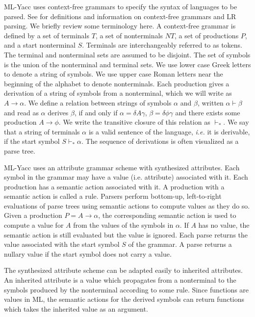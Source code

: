 \documentclass{article}
\begin{document}
ML-Yacc uses context-free grammars to specify the syntax of languages to
be parsed.  See \cite{ahu} for definitions and information on context-free
grammars and LR parsing.  We briefly review some terminology here.  A
context-free grammar is defined by a set of terminals $T$, a set of
nonterminals $NT$, a set of productions $P$, and a start
nonterminal $S$.  
Terminals are interchangeably referred to as tokens.  The terminal
and nonterminal sets are assumed to be disjoint.  The set of symbols is the
union of the nonterminal and terminal sets.  We use lower case
Greek letters to denote a string of symbols.  We use upper case
Roman letters near the beginning of the alphabet to denote nonterminals.
Each production gives a
derivation of a string of symbols from a nonterminal, which we will
write as $A \rightarrow \alpha$.  We define a relation between strings of
symbols $\alpha$ and $\beta$, written $\alpha \vdash \beta$ and read
as $\alpha$ derives $\beta$, if and only if $\alpha = \delta A \gamma$,
$\beta = \delta \phi \gamma$ and 
there exists some production $A \rightarrow \phi$.  We write the
transitive closure of this relation as 
$\vdash_*$. We say that a string of terminals $\alpha$ is a valid sentence
of the language, {\em i.e.} it is derivable, if the start symbol
$S \vdash_* \alpha$.   The sequence of derivations is often
visualized as a parse tree.

ML-Yacc uses an attribute grammar scheme with synthesized attributes.
Each symbol in the grammar may have a value (i.e. attribute) associated
with it.  Each production has a semantic action associated with it.
A production with a semantic action is called a rule. 
Parsers perform bottom-up, left-to-right evaluations of parse trees using semantic
actions to compute values as they do so.  Given a production
$P = A \rightarrow \alpha$, the corresponding semantic action is
used to compute a value for $A$ from the values of the symbols in $\alpha$.
If $A$ has no value, the semantic action is still evaluated but the value is ignored.
Each parse returns the value associated with the start symbol $S$ of the
grammar.  A parse returns a nullary value if the start symbol does not carry a value.

The synthesized attribute scheme can be adapted easily to inherited
attributes. An inherited attribute is a value which propagates from
a nonterminal to the symbols produced by the nonterminal according to
some rule.  Since functions are values in ML,
the semantic actions for the derived symbols
can return functions which takes the
inherited value as an argument.
\end{document}
